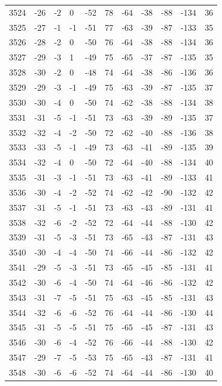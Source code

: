 \begin{table}[H]
\begin{tabular}{lllllllllll}
3524 & -26 & -2 & 0 & -52 & 78 & -64 & -38 & -88 & -134 & 36 \\
3525 & -27 & -1 & -1 & -51 & 77 & -63 & -39 & -87 & -133 & 35 \\
3526 & -28 & -2 & 0 & -50 & 76 & -64 & -38 & -88 & -134 & 36 \\
3527 & -29 & -3 & 1 & -49 & 75 & -65 & -37 & -87 & -135 & 35 \\
3528 & -30 & -2 & 0 & -48 & 74 & -64 & -38 & -86 & -136 & 36 \\
3529 & -29 & -3 & -1 & -49 & 75 & -63 & -39 & -87 & -135 & 37 \\
3530 & -30 & -4 & 0 & -50 & 74 & -62 & -38 & -88 & -134 & 38 \\
3531 & -31 & -5 & -1 & -51 & 73 & -63 & -39 & -89 & -135 & 37 \\
3532 & -32 & -4 & -2 & -50 & 72 & -62 & -40 & -88 & -136 & 38 \\
3533 & -33 & -5 & -1 & -49 & 73 & -63 & -41 & -89 & -135 & 39 \\
3534 & -32 & -4 & 0 & -50 & 72 & -64 & -40 & -88 & -134 & 40 \\
3535 & -31 & -3 & -1 & -51 & 73 & -63 & -41 & -89 & -133 & 41 \\
3536 & -30 & -4 & -2 & -52 & 74 & -62 & -42 & -90 & -132 & 42 \\
3537 & -31 & -5 & -1 & -51 & 73 & -63 & -43 & -89 & -131 & 41 \\
3538 & -32 & -6 & -2 & -52 & 72 & -64 & -44 & -88 & -130 & 42 \\
3539 & -31 & -5 & -3 & -51 & 73 & -65 & -43 & -87 & -131 & 43 \\
3540 & -30 & -4 & -4 & -50 & 74 & -66 & -44 & -86 & -132 & 42 \\
3541 & -29 & -5 & -3 & -51 & 73 & -65 & -45 & -85 & -131 & 41 \\
3542 & -30 & -6 & -4 & -50 & 74 & -64 & -46 & -86 & -132 & 42 \\
3543 & -31 & -7 & -5 & -51 & 75 & -63 & -45 & -85 & -131 & 43 \\
3544 & -32 & -6 & -6 & -52 & 76 & -64 & -44 & -86 & -130 & 44 \\
3545 & -31 & -5 & -5 & -51 & 75 & -65 & -45 & -87 & -131 & 43 \\
3546 & -30 & -6 & -4 & -52 & 76 & -66 & -44 & -88 & -130 & 42 \\
3547 & -29 & -7 & -5 & -53 & 75 & -65 & -43 & -87 & -131 & 41 \\
3548 & -30 & -6 & -6 & -52 & 74 & -64 & -44 & -86 & -130 & 40 \\

\end{tabular}
\end{table}
